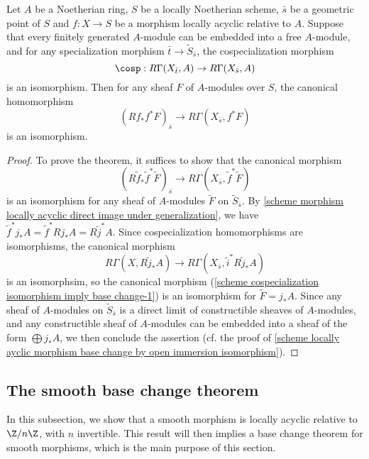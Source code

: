 \begin{theorem}\label{scheme cospecialization isomorphism imply base change}
Let $A$ be a Noetherian ring, $S$ be a locally Noetherian scheme, $\bar{s}$ be a geometric point of $S$ and $f:X\to S$ be a morphism locally acyclic relative to $A$. Suppose that every finitely generated $A$-module can be embedded into a free $A$-module, and for any specialization morphism $\bar{t}\to\widetilde{S}_{\bar{s}}$, the cospecialization morphism
\[\cosp:R\Gamma(X_{\bar{t}},A)\to R\Gamma(X_{\bar{s}},A)\]
is an isomorphism. Then for any sheaf $F$ of $A$-modules over $S$, the canonical homomorphism
\[(Rf_*f^*F)_{\bar{s}}\to R\Gamma(X_{\bar{s}},f^*F)\]
is an isomorphism.
\end{theorem}
\begin{proof}
To prove the theorem, it suffices to show that the canonical morphism
\begin{equation}\label{scheme cospecialization isomorphism imply base change-1}
(R\tilde{f}_*\tilde{f}^*\widetilde{F})_{\bar{s}}\to R\Gamma(X_{\bar{s}},\tilde{f}^*\widetilde{F})
\end{equation}
is an isomorphism for any sheaf of $A$-modules $\widetilde{F}$ on $\widetilde{S}_{\bar{s}}$. By \cref{scheme morphism locally acyclic direct image under generalization}, we have $\tilde{f}^*j_*A=\tilde{f}^*Rj_*A=R\tilde{j}^*A$. Since cospecialization homomorphisms are isomorphisms, the canonical morphism
\[R\Gamma(X,R\tilde{j}_*A)\to R\Gamma(X_{\bar{s}},\tilde{i}^*R\tilde{j}_*A)\]
is an isomorphsim, so the canonical morphism (\ref{scheme cospecialization isomorphism imply base change-1}) is an isomorphism for $\widetilde{F}=j_*A$. Since any sheaf of $A$-modules on $\widetilde{S}_{\bar{s}}$ is a direct limit of constructible sheaves of $A$-modules, and any constructible sheaf of $A$-modules can be embedded into a sheaf of the form $\bigoplus j_*A$, we then conclude the assertion (cf. the proof of \cref{scheme locally ayclic morphism base change by open immersion isomorphism}).
\end{proof}

\subsection{The smooth base change theorem}
In this subsection, we show that a smooth morphism is locally acyclic relative to $\Z/n\Z$, with $n$ invertible. This result will then implies a base change theorem for smooth morphisms, which is the main purpose of this section. 

